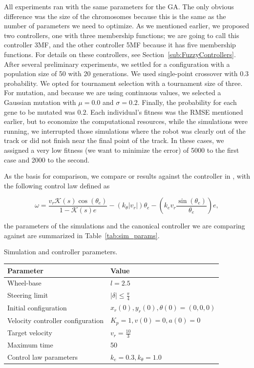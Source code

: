 \documentclass[symmetry,article,submit,moreauthors,pdftex]{Definitions/mdpi}
\begin{document}
All experiments ran with the same parameters for the GA. The only obvious
difference was the size of the chromosomes because this is the same as the
number of parameters we need to optimize. As we mentioned earlier, we proposed
two controllers, one with three membership functions; we are going to call this
controller 3MF, and the other controller 5MF because it has five membership
functions. For details on these controllers, see
Section~\ref{sub:FuzzyControllers}.  After several preliminary experiments, we
settled for a configuration with a population size of 50 with 20 generations.
We used single-point crossover with $0.3$ probability.  We opted for tournament
selection with a tournament size of three. For mutation, and because we are
using continuous values, we selected a Gaussian mutation with $\mu=0.0$ and
$\sigma=0.2$. Finally, the probability for each gene to be mutated was $0.2$.
Each individual's fitness was the RMSE mentioned earlier, but to economize the
computational resources, while the simulations were running, we interrupted
those simulations where the robot was clearly out of the track or did not
finish near the final point of the track. In these cases, we assigned a very
low fitness (we want to minimize the error) of 5000 to the first case and 2000
to the second.  

As the basis for comparison, we compare or results against the controller in
\cite{paden_survey_2016}, with the following control law defined as 

\begin{equation}\label{eq:controller}
\omega = \frac{v_r \mathcal{K}(s) \cos(\theta_e)}{1 - \mathcal{K}(s)e} -
  (k_{\theta}|v_r|)\theta_e - \left( k_ev_r \frac{\sin(\theta_e)}{\theta_e}\right) e,
\end{equation}

the parameters of the simulations and the canonical controller we are comparing
against are summarized in Table~\ref{tab:sim_params}.

\begin{specialtable}[H] 
\small
\caption{Simulation and controller parameters.}\label{tab:sim_params}
\begin{tabular}{ll}
\toprule
\textbf{Parameter}	& \textbf{Value}\\
\midrule
Wheel-base & $l=2.5$		\\
Steering limit & $|\delta|\le \frac{\pi}{4}$	\\
Initial configuration & $x_r(0),y_r(0),\theta(0)= (0,0,0)$\\
Velocity controller configuration & $K_p=1, v(0)=0, a(0)=0$\\
Target velocity & $v_r=\frac{10}{3}$\\
Maximum time & 50 \\ 
Control law parameters&$k_e=0.3, k_{\theta}=1.0$\\ 
\bottomrule
\end{tabular}
\end{specialtable}
\end{document}
